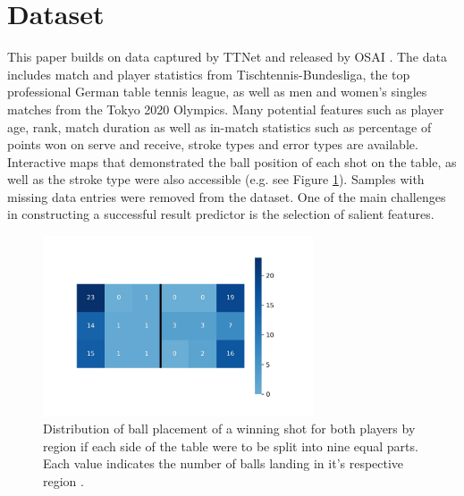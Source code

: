 \section{Dataset} \label{dataset}
This paper builds on data captured by TTNet \cite{voeikov2020ttnet} and released by OSAI \cite{OSAI}. The data includes match and player statistics from Tischtennis-Bundesliga, the top professional German table tennis league, as well as men and women's singles matches from the Tokyo 2020 Olympics. Many potential features such as player age, rank, match duration as well as in-match statistics such as percentage of points won on serve and receive, stroke types and error types are available. Interactive maps that demonstrated the ball position of each shot on the table, as well as the stroke type were also accessible (e.g. see Figure \ref{fig1}). Samples with missing data entries were removed from the dataset. One of the main challenges in constructing a successful result predictor is the selection of salient features.


\begin{figure}[ht]
\centering

\includegraphics[width=8cm]{plots/tableheatmaplot.pdf}
\caption{Distribution of ball placement of a winning shot for both players by region if each side of the table were to be split into nine equal parts. Each value indicates the number of balls landing in it's respective region \cite{OSAI}.}

\label{fig1}
\end{figure}